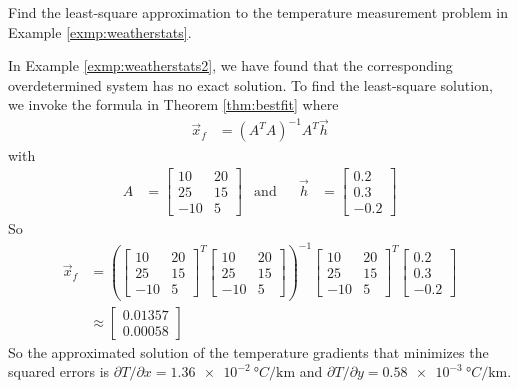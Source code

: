 \begin{exmp}
Find the least-square approximation to the temperature measurement problem in Example \ref{exmp:weatherstats}.
\end{exmp}
\begin{solution}
In Example \ref{exmp:weatherstats2}, we have found that the corresponding overdetermined system has no exact solution. To find the least-square solution, we invoke the formula in Theorem \ref{thm:bestfit} where
\begin{align*}
\vec{x}_f &= (A^TA)^{-1}A^T\vec{h}
\end{align*}
with 
\begin{align*}
A &= 
\begin{bmatrix}
10 & 20 \\
25 & 15 \\
-10 & 5
\end{bmatrix}
& \text{and} &
& \vec{h} &= \begin{bmatrix}
0.2 \\
0.3 \\
-0.2
\end{bmatrix}
\end{align*}
So
\begin{align*}
\vec{x}_f &= 
\left(\begin{bmatrix}
10 & 20 \\
25 & 15 \\
-10 & 5
\end{bmatrix}^T
\begin{bmatrix}
10 & 20 \\
25 & 15 \\
-10 & 5
\end{bmatrix}\right)^{-1}
\begin{bmatrix}
10 & 20 \\
25 & 15 \\
-10 & 5
\end{bmatrix}^T
\begin{bmatrix}
0.2 \\
0.3 \\
-0.2
\end{bmatrix} \\
&\approx 
\begin{bmatrix}
0.01357 \\
0.00058
\end{bmatrix}
\end{align*}
So the approximated solution of the temperature gradients that minimizes the squared errors is $\partial T/\partial x = \SI{1.36e-2}{\degree C \per \km} $ and $\partial T/\partial y = \SI{0.58e-3}{\degree C \per \km}$.
\end{solution}

